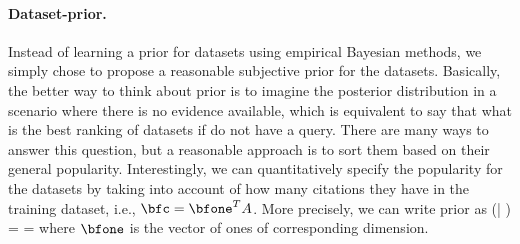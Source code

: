 \documentclass[twoside,11pt]{article}
\begin{document}
\paragraph{Dataset-prior.} Instead of learning a prior for datasets using empirical Bayesian methods, we simply chose to propose a reasonable subjective prior for the datasets. Basically, the better way to think about prior is to imagine the posterior distribution in a scenario where there is no evidence available, which is equivalent to say that what is the best ranking of datasets if do not have a query. There are many ways to answer this question, but a reasonable approach is to sort them based on their general popularity. Interestingly, we can quantitatively specify the popularity for the datasets by taking into account of how many citations they have in the training dataset, i.e., $\bfc=\bfone^TA$. More precisely, we can write prior as
\beq \label{eq:prior}
\pr(\bfy | \bfc ) =  = 
\eeq
where $\bfone$ is the vector of ones of corresponding dimension.
\end{document}
